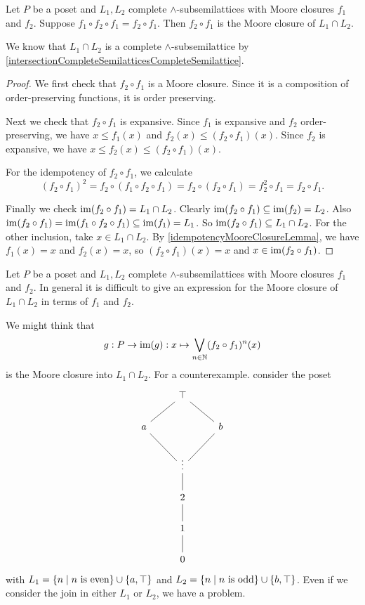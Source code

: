 \begin{proposition} \label{MooreClosureIntersectionCompleteSublattices}
Let $P$ be a poset and $L_1, L_2$ complete $\wedge$-subsemilattices with Moore closures $f_1$ and $f_2$. Suppose $f_1 \circ f_2 \circ f_1 = f_2\circ f_1$. Then $f_2\circ f_1$ is the Moore closure of $L_1\cap L_2$.
\end{proposition}
We know that $L_1\cap L_2$ is a complete $\wedge$-subsemilattice by \ref{intersectionCompleteSemilatticesCompleteSemilattice}.
\begin{proof}
We first check that $f_2\circ f_1$ is a Moore closure. Since it is a composition of order-preserving functions, it is order preserving.

Next we check that $f_2\circ f_1$ is expansive. Since $f_1$ is expansive and $f_2$ order-preserving, we have $x \leq f_1(x)$ and $f_2(x)\leq (f_2\circ f_1)(x)$. Since $f_2$ is expansive, we have $x \leq f_2(x) \leq (f_2\circ f_1)(x)$.

For the idempotency of $f_2\circ f_1$, we calculate
\[ (f_2\circ f_1)^2 = f_2\circ (f_1\circ f_2\circ f_1) = f_2 \circ (f_2 \circ f_1) = f_2^2 \circ f_1 = f_2 \circ f_1. \]

Finally we check $\operatorname{im}(f_2\circ f_1) = L_1\cap L_2$. Clearly $\operatorname{im}(f_2\circ f_1) \subseteq \operatorname{im}(f_2) = L_2$. Also $\operatorname{im}(f_2\circ f_1) = \operatorname{im}(f_1\circ f_2\circ f_1) \subseteq \operatorname{im}(f_1) = L_1$. So $\operatorname{im}(f_2\circ f_1) \subseteq L_1\cap L_2$. For the other inclusion, take $x\in L_1\cap L_2$. By \ref{idempotencyMooreClosureLemma}, we have $f_1(x) = x$ and $f_2(x) = x$, so $(f_2\circ f_1)(x) = x$ and $x\in \operatorname{im}(f_2\circ f_1)$.
\end{proof}

\begin{example}
Let $P$ be a poset and $L_1, L_2$ complete $\wedge$-subsemilattices with Moore closures $f_1$ and $f_2$. In general it is difficult to give an expression for the Moore closure of $L_1\cap L_2$ in terms of $f_1$ and $f_2$.

We might think that
\[ g: P \to \operatorname{im}(g): x\mapsto \bigvee_{n\in \mathbb{N}}(f_2\circ f_1)^n(x) \]
is the Moore closure into $L_1\cap L_2$. For a counterexample. consider the poset
\[ \begin{tikzcd}
& \top \ar[dl, dash] \ar[dr, dash] & \\
a \ar[dr, dash] & & b \ar[dl, dash] \\
& \vdots \ar[d, dash] & \\
& 2 \ar[d, dash] & \\
& 1 \ar[d, dash] & \\
& 0 & 
\end{tikzcd} \]
with $L_1 = \setbuilder{n}{\text{$n$ is even}} \cup \{a, \top\}$ and $L_2 = \setbuilder{n}{\text{$n$ is odd}} \cup \{b, \top\}$. Even if we consider the join in either $L_1$ or $L_2$, we have a problem.
\end{example}



